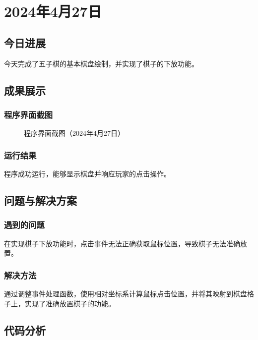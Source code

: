 \section{2024年4月27日} %

\subsection{今日进展} %
今天完成了五子棋的基本棋盘绘制，并实现了棋子的下放功能。

\subsection{成果展示} %

\subsubsection{程序界面截图}
\begin{figure}[h]
    \centering
    \caption{程序界面截图（2024年4月27日）}
    \label{fig:screenshot_0427}
\end{figure}

\subsubsection{运行结果}
程序成功运行，能够显示棋盘并响应玩家的点击操作。

\subsection{问题与解决方案} %

\subsubsection{遇到的问题}
在实现棋子下放功能时，点击事件无法正确获取鼠标位置，导致棋子无法准确放置。

\subsubsection{解决方法}
通过调整事件处理函数，使用相对坐标系计算鼠标点击位置，并将其映射到棋盘格子上，实现了准确放置棋子的功能。

\subsection{代码分析} %

